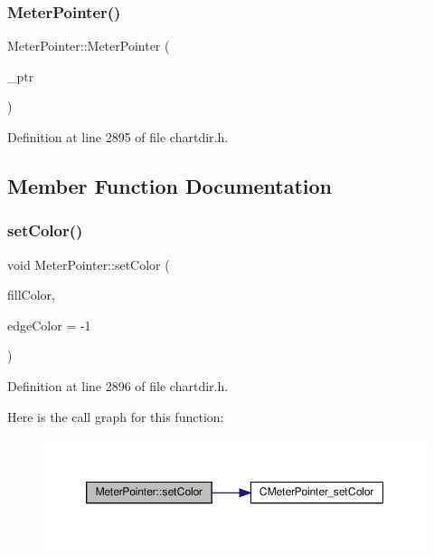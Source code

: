 \subsubsection{\texorpdfstring{Meter\+Pointer()}{MeterPointer()}}
{\footnotesize\ttfamily Meter\+Pointer\+::\+Meter\+Pointer (\begin{DoxyParamCaption}\item[{Meter\+Pointer\+Internal $\ast$}]{\+\_\+ptr }\end{DoxyParamCaption})\hspace{0.3cm}{\ttfamily [inline]}}



Definition at line 2895 of file chartdir.\+h.



\subsection{Member Function Documentation}
\mbox{\label{class_meter_pointer_ae53620b550381d721b3319fa9d41178c}} 
\subsubsection{\texorpdfstring{set\+Color()}{setColor()}}
{\footnotesize\ttfamily void Meter\+Pointer\+::set\+Color (\begin{DoxyParamCaption}\item[{int}]{fill\+Color,  }\item[{int}]{edge\+Color = {\ttfamily -\/1} }\end{DoxyParamCaption})\hspace{0.3cm}{\ttfamily [inline]}}



Definition at line 2896 of file chartdir.\+h.

Here is the call graph for this function\+:
\nopagebreak
\begin{figure}[H]
\begin{center}
\leavevmode
\includegraphics[width=350pt]{class_meter_pointer_ae53620b550381d721b3319fa9d41178c_cgraph}
\end{center}
\end{figure}
\mbox{\label{class_meter_pointer_ac76bcf974ea61a13867aef4e83c02a48}} 
